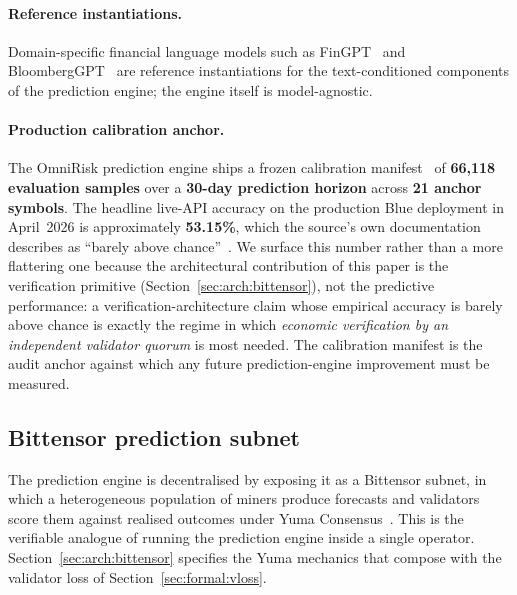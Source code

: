 \documentclass[11pt,a4paper]{article}
\begin{document}
\paragraph{Reference instantiations.} Domain-specific financial language models such
as FinGPT~\cite{yang2023fingpt} and BloombergGPT~\cite{wu2023bloomberggpt} are
reference instantiations for the text-conditioned components of the prediction
engine; the engine itself is model-agnostic.

\paragraph{Production calibration anchor.} The OmniRisk prediction engine ships a
frozen calibration manifest~\cite{omnirisk2026calibration} of \textbf{66{,}118
evaluation samples} over a \textbf{30-day prediction horizon} across
\textbf{21 anchor symbols}. The headline live-API accuracy on the production Blue
deployment in April~2026 is approximately \textbf{53.15\%}, which the source's own
documentation describes as ``barely above chance''~\cite{omnirisk2026systemdesign}.
We surface this number rather than a more flattering one because the architectural
contribution of this paper is the verification primitive
(Section~\ref{sec:arch:bittensor}), not the predictive performance: a
verification-architecture claim whose empirical accuracy is barely above chance is
exactly the regime in which \emph{economic verification by an independent validator
quorum} is most needed. The calibration manifest is the audit anchor against which
any future prediction-engine improvement must be measured.

\subsection{Bittensor prediction subnet}\label{sec:engine:subnet}

The prediction engine is decentralised by exposing it as a Bittensor subnet, in
which a heterogeneous population of miners produce forecasts and validators score
them against realised outcomes under Yuma Consensus~\cite{rao2021bittensor,
steeves2022incentivizing,opentensor2024yuma}. This is the verifiable analogue of
running the prediction engine inside a single operator. Section~\ref{sec:arch:bittensor}
specifies the Yuma mechanics that compose with the validator loss of
Section~\ref{sec:formal:vloss}.
\end{document}
